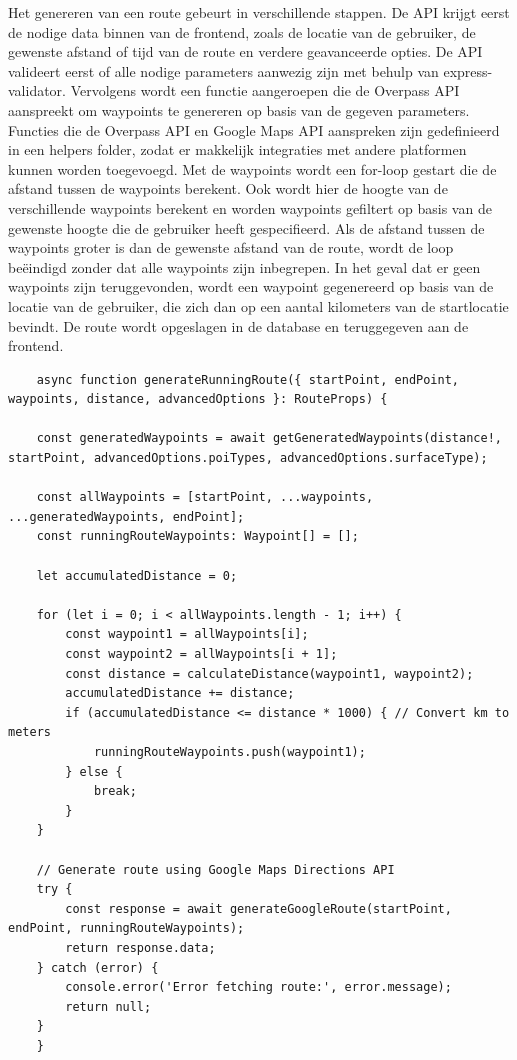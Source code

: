     Het genereren van een route gebeurt in verschillende stappen. 
    De API krijgt eerst de nodige data binnen van de frontend, zoals de locatie van de gebruiker, de gewenste afstand of tijd van de route en verdere geavanceerde opties. 
    De API valideert eerst of alle nodige parameters aanwezig zijn met behulp van express-validator. 
    Vervolgens wordt een functie aangeroepen die de Overpass API aanspreekt om waypoints te genereren op basis van de gegeven parameters. 
    Functies die de Overpass API en Google Maps API aanspreken zijn gedefinieerd in een helpers folder, zodat er makkelijk integraties met andere platformen kunnen worden toegevoegd. 
    Met de waypoints wordt een for-loop gestart die de afstand tussen de waypoints berekent. Ook wordt hier de hoogte van de verschillende waypoints berekent en worden waypoints gefiltert 
    op basis van de gewenste hoogte die de gebruiker heeft gespecifieerd.
    Als de afstand tussen de waypoints groter is dan de gewenste afstand van de route,
    wordt de loop beëindigd zonder dat alle waypoints zijn inbegrepen. 
    In het geval dat er geen waypoints zijn teruggevonden, wordt een waypoint gegenereerd op basis van de locatie van de gebruiker, die zich dan op een aantal kilometers van de startlocatie bevindt. 
    De route wordt opgeslagen in de database en teruggegeven aan de frontend.

    \pagebreak

\begin{lstlisting}
    async function generateRunningRoute({ startPoint, endPoint, waypoints, distance, advancedOptions }: RouteProps) {

    const generatedWaypoints = await getGeneratedWaypoints(distance!, startPoint, advancedOptions.poiTypes, advancedOptions.surfaceType);

    const allWaypoints = [startPoint, ...waypoints, ...generatedWaypoints, endPoint];
    const runningRouteWaypoints: Waypoint[] = [];

    let accumulatedDistance = 0;

    for (let i = 0; i < allWaypoints.length - 1; i++) {
        const waypoint1 = allWaypoints[i];
        const waypoint2 = allWaypoints[i + 1];
        const distance = calculateDistance(waypoint1, waypoint2);
        accumulatedDistance += distance;
        if (accumulatedDistance <= distance * 1000) { // Convert km to meters
            runningRouteWaypoints.push(waypoint1);
        } else {
            break;
        }
    }

    // Generate route using Google Maps Directions API
    try {
        const response = await generateGoogleRoute(startPoint, endPoint, runningRouteWaypoints);
        return response.data;
    } catch (error) {        
        console.error('Error fetching route:', error.message);
        return null;
    }
    }
\end{lstlisting}

    